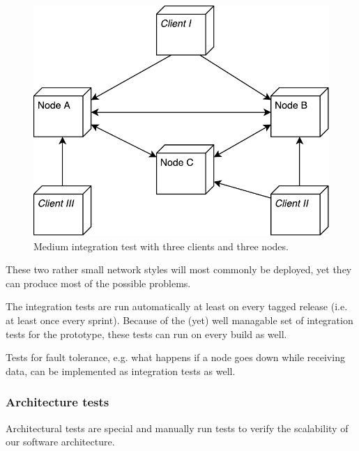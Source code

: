 \begin{figure}
	\centering
	\includegraphics[width=0.5\linewidth]{resources/integration_test_medium}
	\caption[Medium integration test]{Medium integration test with three \glspl{client} and three \glspl{node}.}
	\label{fig:integrationtestmedium}
\end{figure}

These two rather small network styles will most commonly be deployed, yet they can produce most of the possible problems.

The integration tests are run automatically at least on every tagged release (i.e. at least once every sprint). Because of the (yet) well managable set of integration tests for the prototype, these tests can run on every build as well.

Tests for fault tolerance, e.g. what happens if a \gls{node} goes down while receiving data, can be implemented as integration tests as well.

\subsubsection{Architecture tests}

Architectural tests are special and manually run tests to verify the scalability of our software architecture.